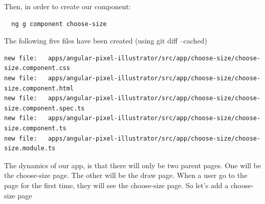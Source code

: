 Then, in order to create our component:
\begin{verbatim}
  ng g component choose-size
\end{verbatim}
The following five files have been created (using git diff --cached)
\begin{lstlisting}[breaklines]
new file:   apps/angular-pixel-illustrator/src/app/choose-size/choose-size.component.css
new file:   apps/angular-pixel-illustrator/src/app/choose-size/choose-size.component.html
new file:   apps/angular-pixel-illustrator/src/app/choose-size/choose-size.component.spec.ts
new file:   apps/angular-pixel-illustrator/src/app/choose-size/choose-size.component.ts
new file:   apps/angular-pixel-illustrator/src/app/choose-size/choose-size.module.ts
\end{lstlisting}

The dynamics of our app, is that there will only be two parent pages. One will
be the choose-size page. The other will be the draw page. When a user go to the
page for the first time, they will see the choose-size page. So let's add a choose-size page
